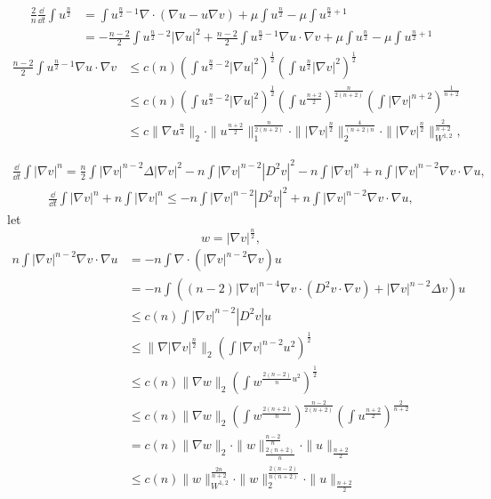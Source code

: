 \begin{align*}
	\frac2n\frac{\dd}{\dd t}\int u^{\frac n2} 
	&= \int u^{\frac n2-1}\nabla\cdot(\nabla u - u\nabla v) + \mu\int u^{\frac n2} - \mu\int u^{\frac n2+1}\\
	&= -\frac{n-2}{2}\int u^{\frac n2-2}|\nabla u|^2 
		+ \frac{n-2}{2}\int u^{\frac n2-1}\nabla u\cdot\nabla v + \mu\int u^{\frac n2} - \mu\int u^{\frac n2+1}
\end{align*}
\begin{align*}
	\frac{n-2}{2}\int u^{\frac n2-1}\nabla u\cdot\nabla v
	&\leq c(n) \left(\int u^{\frac n2-2}|\nabla u|^2\right)^{\frac12}
		\left(\int u^{\frac n2}|\nabla v|^2\right)^{\frac12}\\
	&\leq c(n) \left(\int u^{\frac n2-2}|\nabla u|^2\right)^{\frac12}
		\left(\int u^{\frac{n+2}{2}}\right)^{\frac{n}{2(n+2)}}
		\left(\int |\nabla v|^{n+2}\right)^{\frac1{n+2}}\\
	&\leq c\|\nabla u^{\frac n4}\|_2
		\cdot \|u^{\frac{n+2}{2}}\|_1^{\frac{n}{2(n+2)}}
		\cdot \||\nabla v|^{\frac n2}\|_2^{\frac{4}{(n+2)n}}
		\cdot \||\nabla v|^{\frac n2}\|_{W^{1,2}}^{\frac{2}{n+2}},
\end{align*}

\begin{align*}
	\frac{\dd}{\dd t}\int |\nabla v|^n 
	= \frac{n}{2} \int |\nabla v|^{n-2}\Delta |\nabla v|^2 - n\int |\nabla v|^{n-2}|D^2v|^2
		- n\int |\nabla v|^n 
		+ n\int |\nabla v|^{n-2}\nabla v\cdot\nabla u,
\end{align*}
\begin{align*}
	\frac{\dd}{\dd t}\int |\nabla v|^n 
		+ n\int |\nabla v|^n
	\leq - n\int |\nabla v|^{n-2}|D^2v|^2
		+ n\int |\nabla v|^{n-2}\nabla v\cdot\nabla u,
\end{align*}
let 
\[
	w=|\nabla v|^{\frac n2},
\]
\begin{align*}
	n\int |\nabla v|^{n-2}\nabla v\cdot\nabla u
	&= -n\int \nabla\cdot(|\nabla v|^{n-2}\nabla v)u \\
	&= -n\int((n-2)|\nabla v|^{n-4}\nabla v \cdot (D^2v\cdot\nabla v) + |\nabla v|^{n-2}\Delta v) u\\
	&\leq c(n)\int |\nabla v|^{n-2}|D^2v|u\\
	&\leq \|\nabla|\nabla v|^{\frac{n}{2}}\|_2\left(\int |\nabla v|^{n-2}u^2\right)^{\frac12}\\
	&\leq c(n)\|\nabla w\|_2\left(\int w^{\frac{2(n-2)}{n}u^2}\right)^{\frac12}\\
	&\leq c(n)\|\nabla w\|_2 \left(\int w^{\frac{2(n+2)}{n}}\right)^{\frac{n-2}{2(n+2)}}
		\left(\int u^{\frac{n+2}{2}}\right)^{\frac{2}{n+2}}\\
	&= c(n)\|\nabla w\|_2 
		\cdot \|w\|_{\frac{2(n+2)}{n}}^{\frac{n-2}{n}}
		\cdot \|u\|_{\frac{n+2}{2}}\\
	&\leq c(n)\|w\|_{W^{1,2}}^{\frac{2n}{n+2}}
		\cdot \|w\|_2^{\frac{2(n-2)}{n(n+2)}}
		\cdot \|u\|_{\frac{n+2}{2}}
\end{align*}